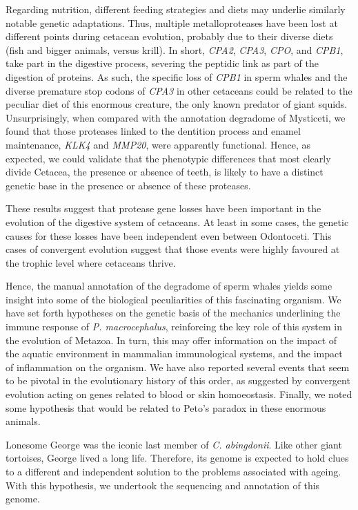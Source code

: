 Regarding nutrition, different feeding strategies and diets may underlie similarly notable genetic adaptations.
Thus, multiple metalloproteases have been lost at different points during cetacean evolution, probably due to their diverse diets (fish and bigger animals, versus krill).
In short, \textit{CPA2}, \textit{CPA3}, \textit{CPO}, and \textit{CPB1}, take part in the digestive process, severing the peptidic link as part of the digestion of proteins.
As such, the specific loss of \textit{CPB1} in sperm whales and the diverse premature stop codons of \textit{CPA3} in other cetaceans could be related to the peculiar diet of this enormous creature, the only known predator of giant squids.
Unsurprisingly, when compared with the annotation degradome of Mysticeti, we found that those proteases linked to the dentition process and enamel maintenance, \textit{KLK4} and \textit{MMP20}, were apparently functional.
Hence, as expected, we could validate that the phenotypic differences that most clearly divide Cetacea, the presence or absence of teeth, is likely to have a distinct genetic base in the presence or absence of these proteases.

These results suggest that protease gene losses have been important in the evolution of the digestive system of cetaceans.
At least in some cases, the genetic causes for these losses have been independent even between Odontoceti.
This cases of convergent evolution suggest that those events were highly favoured at the trophic level where cetaceans thrive.

Hence, the manual annotation of the degradome of sperm whales yields some insight into some of the biological peculiarities of this fascinating organism.
We have set forth hypotheses on the genetic basis of the mechanics underlining the immune response of \textit{P. macrocephalus}, reinforcing the key role of this system in the evolution of Metazoa.
In turn, this may offer information on the impact of the aquatic environment in mammalian immunological systems, and the impact of inflammation on the organism.
We have also reported several events that seem to be pivotal in the evolutionary history of this order, as suggested by convergent evolution acting on genes related to blood or skin homoeostasis.
Finally, we noted some hypothesis that would be related to Peto's paradox in these enormous animals.

Lonesome George was the iconic last member of \textit{C. abingdonii}.
Like other giant tortoises, George lived a long life.
Therefore, its genome is expected to hold clues to a different and independent solution to the problems associated with ageing.
With this hypothesis, we undertook the sequencing and annotation of this genome.

